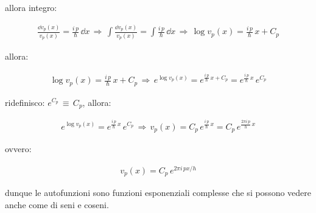 	allora integro:
	
\begin{align*}
	\frac{\dd v_p(x)}{v_p(x)} = \frac{i\, p}{\hbar} \, \dd x \, \Rightarrow \, \int \frac{\dd v_p(x)}{v_p(x)} = \int \frac{i\, p}{\hbar} \, \dd x \, \Rightarrow \, \log v_p(x) = \frac{i\, p}{\hbar}\, x + C_p
\end{align*}

	allora:
	
\begin{align*}
	\log v_p(x) = \frac{i\, p}{\hbar}\, x + C_p \, \Rightarrow \, e^{\log v_p(x)} = e^{\frac{i\, p}{\hbar}\, x + C_p} = e^{\frac{i\, p}{\hbar}\, x} \, e^{C_p}
\end{align*}

	ridefinisco: $e^{C_p}\, \equiv \, C_p$, allora:
	
\begin{align*}
	e^{\log v_p(x)} = e^{\frac{i\, p}{\hbar}\, x} \, e^{C_p} \, \Rightarrow \, v_p(x) = C_p \, e^{\frac{i\, p}{\hbar}\, x} = C_p \, e^{\frac{2 \pi i\, p}{h}\, x}
\end{align*}

	ovvero:
	
\begin{nb}
\begin{align*}
	v_p(x) = C_p \, e^{2 \pi i\, px / h}
\end{align*}
\end{nb}

	dunque le autofunzioni sono funzioni esponenziali complesse che si possono vedere anche come di seni e coseni.
	
